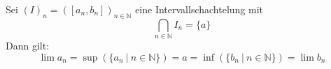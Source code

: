 Sei $(I)_n = ([a_n, b_n])_{n \in \mathbb{N}}$ eine Intervallschachtelung mit
$$\bigcap_{n \in \mathbb{N}} I_n = \{a\}$$
Dann gilt: 
$$\lim a_n = \sup(\{a_n \ | \ n \in \mathbb{N}\}) = a = \inf(\{b_n \ | \ n \in \mathbb{N}\}) = \lim b_n$$